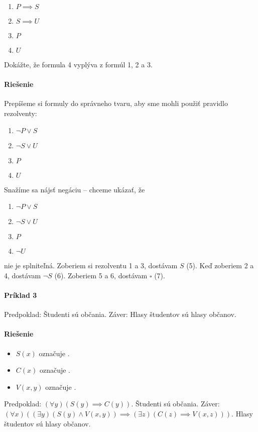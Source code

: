 \begin{enumerate}
	\item $P\implies S$
	\item $S \implies U$
	\item $P$
	\item $U$
\end{enumerate}

Dokážte, že formula 4 vyplýva z formúl 1, 2 a 3. 

\paragraph{Riešenie} Prepíšeme si formuly do správneho tvaru, aby sme mohli
použiť pravidlo rezolventy:
\begin{enumerate}
	\item $\neg P \lor S$
	\item $\neg S\lor U$
	\item $P$
	\item $U$
\end{enumerate}
Snažíme sa nájsť negáciu -- chceme ukázať, že 
\begin{enumerate}
	\item $\neg P \lor S$
	\item $\neg S\lor U$
	\item $P$
	\item $\neg U$
\end{enumerate}

nie je splniteľná. Zoberiem si rezolventu 1 a 3, dostávam $S$ (5). Keď zoberiem 
2 a 4, dostávam $\neg S$ (6). Zoberiem 5 a 6, dostávam $\square$ (7).

\paragraph{Príklad 3} Predpoklad: Študenti sú občania. Záver: Hlasy študentov sú
hlasy občanov.

\paragraph{Riešenie} 
\begin{itemize}
	\item $S(x)$ označuje .
	\item $C(x)$ označuje .
	\item $V(x,y)$ označuje .
\end{itemize}
Predpoklad: $(\forall y) (S(y)\implies C(y))$. Študenti sú občania.
Záver: $(\forall x) ((\exists y) (S(y) \land V(x,y)) \implies (\exists z)(C(z)
\implies V(x,z)))$. Hlasy študentov sú hlasy občanov.

